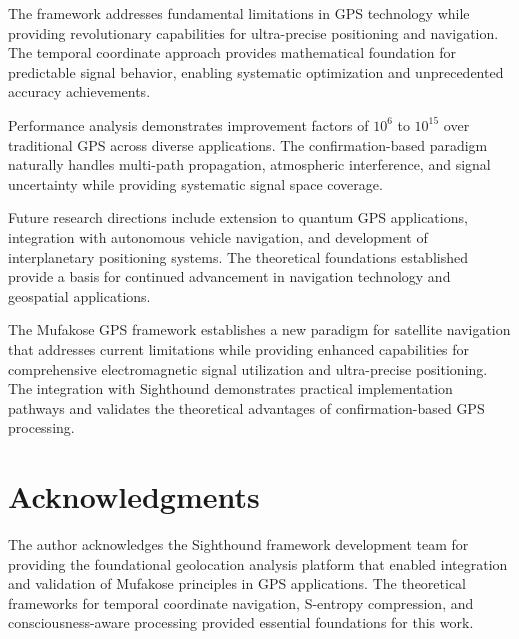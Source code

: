 \documentclass[12pt,a4paper]{article}
\begin{document}
The framework addresses fundamental limitations in GPS technology while providing revolutionary capabilities for ultra-precise positioning and navigation. The temporal coordinate approach provides mathematical foundation for predictable signal behavior, enabling systematic optimization and unprecedented accuracy achievements.

Performance analysis demonstrates improvement factors of $10^6$ to $10^{15}$ over traditional GPS across diverse applications. The confirmation-based paradigm naturally handles multi-path propagation, atmospheric interference, and signal uncertainty while providing systematic signal space coverage.

Future research directions include extension to quantum GPS applications, integration with autonomous vehicle navigation, and development of interplanetary positioning systems. The theoretical foundations established provide a basis for continued advancement in navigation technology and geospatial applications.

The Mufakose GPS framework establishes a new paradigm for satellite navigation that addresses current limitations while providing enhanced capabilities for comprehensive electromagnetic signal utilization and ultra-precise positioning. The integration with Sighthound demonstrates practical implementation pathways and validates the theoretical advantages of confirmation-based GPS processing.

\section{Acknowledgments}

The author acknowledges the Sighthound framework development team for providing the foundational geolocation analysis platform that enabled integration and validation of Mufakose principles in GPS applications. The theoretical frameworks for temporal coordinate navigation, S-entropy compression, and consciousness-aware processing provided essential foundations for this work.
\end{document}
